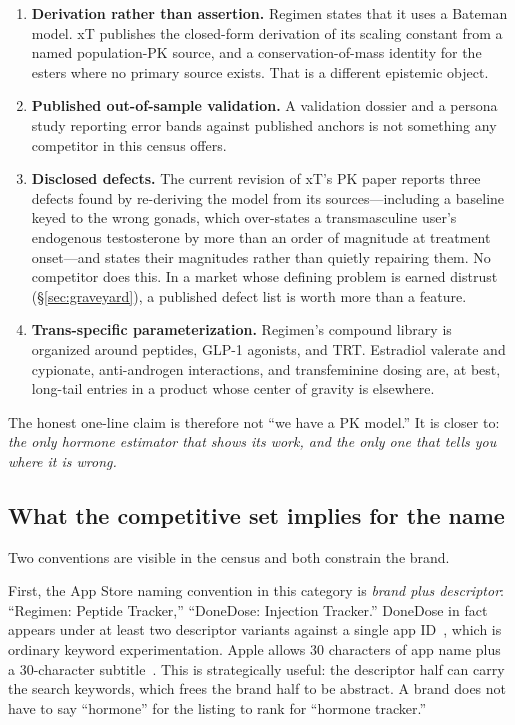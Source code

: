 \documentclass[11pt,a4paper]{article}
\begin{document}
\begin{enumerate}[leftmargin=1.5em,itemsep=0.3em]
\item \textbf{Derivation rather than assertion.} Regimen states that it
      uses a Bateman model. xT publishes the closed-form derivation of
      its scaling constant from a named population-PK source, and a
      conservation-of-mass identity for the esters where no primary
      source exists. That is a different epistemic object.
\item \textbf{Published out-of-sample validation.} A validation dossier
      and a persona study reporting error bands against published
      anchors is not something any competitor in this census offers.
\item \textbf{Disclosed defects.} The current revision of xT's PK paper
      reports three defects found by re-deriving the model from its
      sources---including a baseline keyed to the wrong gonads, which
      over-states a transmasculine user's endogenous testosterone by
      more than an order of magnitude at treatment onset---and states
      their magnitudes rather than quietly repairing them. No
      competitor does this. In a market whose defining problem is
      earned distrust (\S\ref{sec:graveyard}), a published defect list
      is worth more than a feature.
\item \textbf{Trans-specific parameterization.} Regimen's compound
      library is organized around peptides, GLP-1 agonists, and TRT.
      Estradiol valerate and cypionate, anti-androgen interactions, and
      transfeminine dosing are, at best, long-tail entries in a product
      whose center of gravity is elsewhere.
\end{enumerate}

The honest one-line claim is therefore not ``we have a PK model.'' It
is closer to: \emph{the only hormone estimator that shows its work, and
the only one that tells you where it is wrong.}

\subsection{What the competitive set implies for the name}

Two conventions are visible in the census and both constrain the brand.

First, the App Store naming convention in this category is
\emph{brand plus descriptor}: ``Regimen: Peptide Tracker,''
``DoneDose: Injection Tracker.'' DoneDose in fact appears under at
least two descriptor variants against a single app
ID~\cite{donedoselisting}, which is ordinary keyword experimentation.
Apple allows 30 characters of app name plus a 30-character
subtitle~\cite{mobileaction}. This is strategically useful: the
descriptor half can carry the search keywords, which frees the brand
half to be abstract. A brand does not have to say ``hormone'' for the
listing to rank for ``hormone tracker.''
\end{document}
